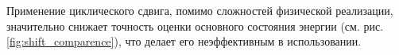 \documentclass[14pt]{extarticle}
\begin{document}
\qquad Применение циклического сдвига, помимо сложностей физической реализации, значительно снижает точность оценки основного состояния энергии (см. рис. \ref{fig:shift_comparence}), что делает его неэффективным в использовании.

\begin{figure}[H]
\begin{minipage}[H]{0.49\linewidth}
\end{minipage}
\hfill
\begin{minipage}[H]{0.49\linewidth}

\end{minipage}
\end{figure}
\end{document}
